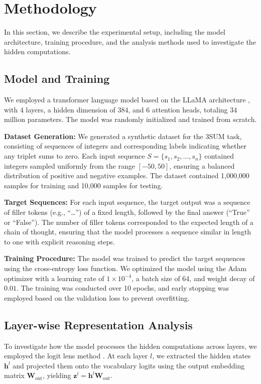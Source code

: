 \documentclass{article}
\begin{document}
\section{Methodology}

In this section, we describe the experimental setup, including the model architecture, training procedure, and the analysis methods used to investigate the hidden computations.

\subsection{Model and Training}

We employed a transformer language model based on the LLaMA architecture \cite{touvron2023llama}, with 4 layers, a hidden dimension of 384, and 6 attention heads, totaling 34 million parameters. The model was randomly initialized and trained from scratch.

\textbf{Dataset Generation:} We generated a synthetic dataset for the 3SUM task, consisting of sequences of integers and corresponding labels indicating whether any triplet sums to zero. Each input sequence $S = \{s_1, s_2, \dots, s_n\}$ contained integers sampled uniformly from the range $[-50, 50]$, ensuring a balanced distribution of positive and negative examples. The dataset contained 1,000,000 samples for training and 10,000 samples for testing.

\textbf{Target Sequences:} For each input sequence, the target output was a sequence of filler tokens (e.g., ``\ldots'') of a fixed length, followed by the final answer (``True'' or ``False''). The number of filler tokens corresponded to the expected length of a chain of thought, ensuring that the model processes a sequence similar in length to one with explicit reasoning steps.

\textbf{Training Procedure:} The model was trained to predict the target sequences using the cross-entropy loss function. We optimized the model using the Adam optimizer with a learning rate of $1 \times 10^{-4}$, a batch size of 64, and weight decay of $0.01$. The training was conducted over 10 epochs, and early stopping was employed based on the validation loss to prevent overfitting.

\subsection{Layer-wise Representation Analysis}

To investigate how the model processes the hidden computations across layers, we employed the logit lens method \cite{nostalgebraist2020}. At each layer $l$, we extracted the hidden states $\mathbf{h}^l$ and projected them onto the vocabulary logits using the output embedding matrix $\mathbf{W}_{\text{out}}$, yielding $\mathbf{z}^l = \mathbf{h}^l \mathbf{W}_{\text{out}}$.
\end{document}
